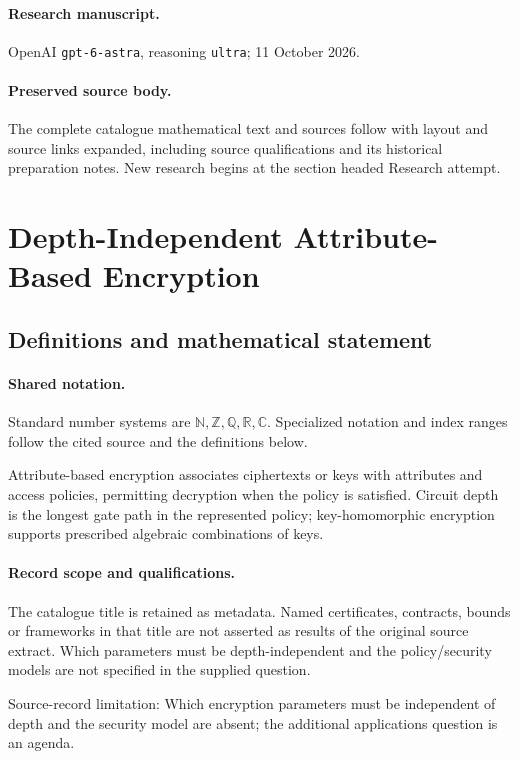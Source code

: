 \documentclass[11pt]{article}
\begin{document}
\paragraph{Research manuscript.} OpenAI \texttt{gpt-6-astra}, reasoning \texttt{ultra}; 11 October 2026.
\paragraph{Preserved source body.} The complete catalogue mathematical text and sources follow with layout and source links expanded, including source qualifications and its historical preparation notes. New research begins at the section headed Research attempt.

\section{Depth-Independent Attribute-Based Encryption}\label{statement}

\subsection{Definitions and mathematical statement}

\paragraph{Shared notation.}Standard number systems are $\mathbb N,\mathbb Z,\mathbb Q,\mathbb R,\mathbb C$. Specialized notation and index ranges follow the cited source and the definitions below.


Attribute-based encryption associates ciphertexts or keys with attributes and access policies, permitting decryption when the policy is satisfied. Circuit depth is the longest gate path in the represented policy; key-homomorphic encryption supports prescribed algebraic combinations of keys.
\paragraph{Record scope and qualifications.}
The catalogue title is retained as metadata. Named certificates, contracts, bounds or frameworks in that title are not asserted as results of the original source extract.
Which parameters must be depth-independent and the policy/security models are not specified in the supplied question.

Source-record limitation: Which encryption parameters must be independent of depth and the security model are absent; the additional applications question is an agenda.
\end{document}
